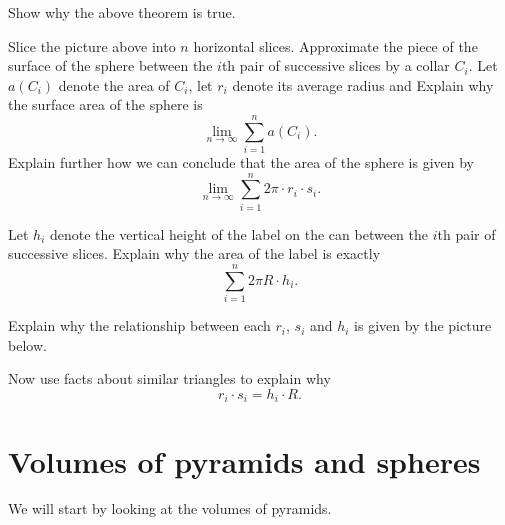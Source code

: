 \documentclass{ximera}
\begin{document}
\begin{problem}
Show why the above theorem is true.

\begin{hint}
Slice the picture above into $n$ horizontal slices. Approximate the
piece of the surface of the sphere between the $i$th pair of
successive slices by a collar $C_{i}$. Let $a\left( C_{i}\right) $
denote the area of $C_{i}$, let $r_{i}$ denote its average radius and
Explain why the surface area of the sphere is
\[
\lim_{n\to \infty}\sum_{i=1}^{n} a(C_i).
\]
Explain further how we can conclude that the area of the sphere is
given by
\[%
\lim_{n\to \infty}\sum_{i=1}^{n} 2\pi\cdot r_{i}\cdot s_{i}.
\]

\end{hint}
\begin{hint}
Let $h_{i}$ denote the vertical height of the label on the can between
the $i$th pair of successive slices. Explain why the area of the label is exactly%
\[%
\sum_{i=1}^{n} 2\pi R \cdot h_{i}.
\]
\end{hint}
\begin{hint}
Explain why the relationship between each $r_{i}$, $s_{i}$ and $h_{i}$
is given by the picture below.
\begin{image}
\end{image}
Now use facts about similar triangles to explain why
\[
r_{i}\cdot s_{i}=h_{i}\cdot R.
\]
\end{hint}
\end{problem}




\section{Volumes of pyramids and spheres}

We will start by looking at the volumes of pyramids.
\end{document}
